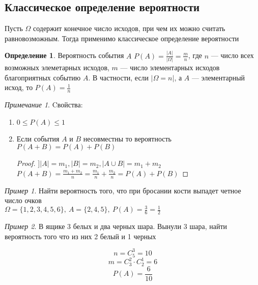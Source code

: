 \documentclass[english]{article}
\theoremstyle{plain}
\theoremstyle{remark}
\newtheorem*{remark}{Примечание}
\newtheorem*{examp}{Пример}
\theoremstyle{definition}
\newtheorem*{definition}{Определение}
\begin{document}
\subsection{Классическое определение вероятности}
\label{sec:org0ab241a}
Пусть \(\Omega\) содержит конечное число исходов, при чем их можно считать равновозможным.
Тогда применимо классическое определение вероятности
\begin{definition}
Вероятность события \(A\) \(P(A) = \frac{|A|}{|\Omega|} = \frac{m}{n}\), где \(n\) --- число всех возможных элеметарных
исходов, \(m\) --- число элементарных исходов благоприятных событию \(A\). В частности, если \(|\Omega = n|\), а \(A\) --- элементарный исход, то \(P(A) = \frac{1}{n}\)
\end{definition}
\begin{remark}
Cвойства:
\begin{enumerate}
\item \(0 \le P(A) \le 1\)
\setcounter{enumi}{3}
\item Если события \(A\) и \(B\) несовместны то вероятность \(P(A + B) = P(A) + P(B)\)
\begin{proof}
\(] |A| = m_1, |B| = m_2, |A\cup B| = m_1 + m_2\) \\
\(P(A + B) = \frac{m_1 + m_2}{n} = \frac{m_1}{n} + \frac{m_2}{n} = P(A) + P(B)\)
\end{proof}
\end{enumerate}
\end{remark}
\begin{examp}
Найти вероятность того, что при бросании кости выпадет четное число очков \\
\(\Omega = \{1, 2, 3, 4, 5, 6\},\ A = \{ 2, 4, 5\},\ P(A) = \frac{3}{6} = \frac{1}{2}\) 
\end{examp}
\begin{examp}
В ящике 3 белых и два черных шара. Вынули 3 шара, найти вероятность того что из них 2 белый и 1 черных
\begin{center}
\end{center}

\[ n = C^3_5 = 10 \]
\[ m = C^2_3\cdot C^1_2 = 6 \]
\[ P(A) = \frac{6}{10} \]
\end{examp}
\end{document}
